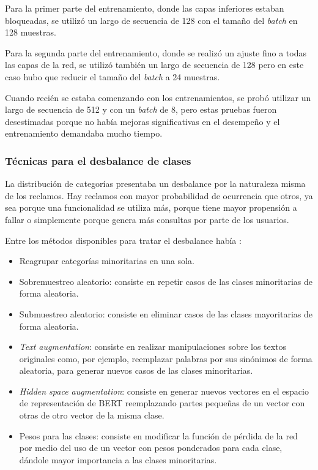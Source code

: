 Para la primer parte del entrenamiento, donde las capas inferiores estaban bloqueadas, se utilizó un largo de secuencia de 128 con el tamaño del \textit{batch} en 128 muestras.

Para la segunda parte del entrenamiento, donde se realizó un ajuste fino a todas las capas de la red, se utilizó también un largo de secuencia de 128 pero en este caso hubo que reducir el tamaño del \textit{batch} a 24 muestras.

Cuando recién se estaba comenzando con los entrenamientos, se probó utilizar un largo de secuencia de 512 y con un \textit{batch} de 8, pero estas pruebas fueron desestimadas porque no había mejoras significativas en el desempeño y el entrenamiento demandaba mucho tiempo.

\subsubsection{Técnicas para el desbalance de clases}

La distribución de categorías presentaba un desbalance por la naturaleza misma de los reclamos. Hay reclamos con mayor probabilidad de ocurrencia que otros, ya sea porque una funcionalidad se utiliza más, porque tiene mayor propensión a fallar o simplemente porque genera más consultas por parte de los usuarios.

Entre los métodos disponibles para tratar el desbalance había \citep{ARTICLE:7} \citep{WEBSITE:25}:
\begin{itemize}
	\item Reagrupar categorías minoritarias en una sola.
	\item Sobremuestreo aleatorio: consiste en repetir casos de las clases minoritarias de forma aleatoria.
	\item Submuestreo aleatorio: consiste en eliminar casos de las clases mayoritarias de forma aleatoria.
	\item \textit{Text augmentation}: consiste en realizar manipulaciones sobre los textos originales como, por ejemplo, reemplazar palabras por sus sinónimos de forma aleatoria, para generar nuevos casos de las clases minoritarias.
	\item \textit{Hidden space augmentation}: consiste en generar nuevos vectores en el espacio de representación de BERT reemplazando partes pequeñas de un vector con otras de otro vector de la misma clase.
	\item Pesos para las clases: consiste en modificar la función de pérdida de la red por medio del uso de un vector con pesos ponderados para cada clase, dándole mayor importancia a las clases minoritarias.
\end{itemize}

